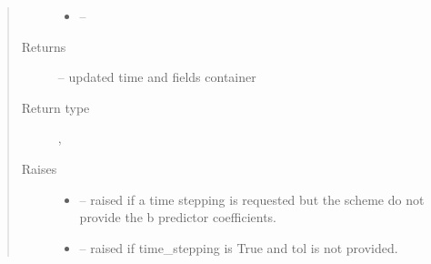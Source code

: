 \documentclass[letterpaper,10pt,english]{sphinxmanual}
\begin{document}
\begin{fulllineitems}
\begin{fulllineitems}
\begin{quote}
\begin{description}
\begin{itemize}
\item {} 
 -- 

\end{itemize}

\item[{Returns}] \leavevmode
{} -- updated time and fields container

\item[{Return type}] \leavevmode
{\hyperref[\detokenize{triflow.core:triflow.core.simulation.Simulation.t}]{}}, {\hyperref[\detokenize{triflow.core:module-triflow.core.fields}]{}}

\item[{Raises}] \leavevmode\begin{itemize}
\item {} 
 -- raised if a time stepping is requested but the scheme do not provide the b predictor coefficients.

\item {} 
 -- raised if time\_stepping is True and tol is not provided.

\end{itemize}

\end{description}\end{quote}

\end{fulllineitems}


\end{fulllineitems}

\end{document}
